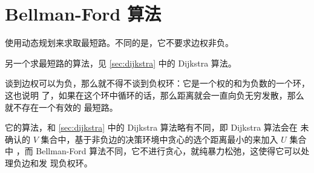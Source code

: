 \section{Bellman-Ford 算法} \label{sec:Bellman-Ford算法}
使用动态规划来求取最短路。不同的是，它不要求边权非负。

另一个求最短路的算法，见 \ref{sec:dijkstra} 中的 Dijkstra 算法。

谈到边权可以为负，那么就不得不谈到负权环：它是一个权的和为负数的一个环，这也说明
了，如果在这个环中循环的话，那么距离就会一直向负无穷发散，那么就不存在一个有效的
最短路。

它的算法，和 \ref{sec:dijkstra} 中的 Dijkstra 算法略有不同，即 Dijkstra 算法会在
未确认的 $V$ 集合中，基于非负边的决策环境中贪心的选个距离最小的来加入 $U$ 集合中
，而 Bellman-Ford 算法不同，它不进行贪心，就纯暴力松弛，这使得它可以处理负边和发
现负权环。



